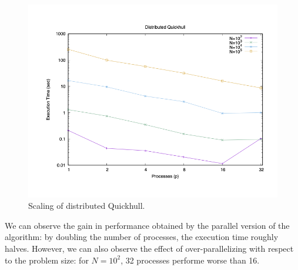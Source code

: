 \documentclass[]{finalproject}
\begin{document}
\begin{figure}[H]
    \centering
    \includegraphics[width=0.7\linewidth]{gpStrongTime.png}
    \caption{Scaling of distributed Quickhull.}
    \label{fig:qh-scaling}
\end{figure}

We can observe the gain in performance obtained by the parallel version of the algorithm:
by doubling the number of processes, the execution time roughly halves.
However, we can also observe the effect of over-parallelizing with respect to the problem size:
for $N=10^2$, 32 processes performe worse than 16.

\clearpage


\end{document}
